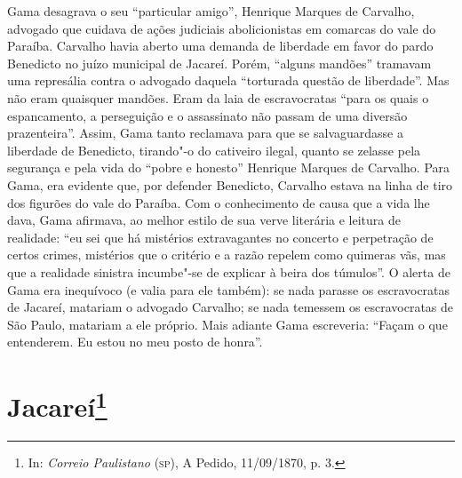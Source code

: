 \@openrighttrue\makeatother \endgroup

\pagebreak
\mbox{}\vfill
\thispagestyle{empty}

{\small\noindent
Gama desagrava o seu ``particular amigo'', Henrique Marques de
Carvalho, advogado que cuidava de ações judiciais abolicionistas em
comarcas do vale do Paraíba. Carvalho havia aberto uma demanda de
liberdade em favor do pardo Benedicto no juízo municipal de Jacareí.
Porém, ``alguns mandões'' tramavam uma represália contra o advogado
daquela ``torturada questão de liberdade''. Mas não eram quaisquer
mandões. Eram da laia de escravocratas ``para os quais o espancamento, a
perseguição e o assassinato não passam de uma diversão prazenteira''.
Assim, Gama tanto reclamava para que se salvaguardasse a liberdade de
Benedicto, tirando"-o do cativeiro ilegal, quanto se zelasse pela
segurança e pela vida do ``pobre e honesto'' Henrique Marques de Carvalho.
Para Gama, era evidente que, por defender Benedicto, Carvalho estava na
linha de tiro dos figurões do vale do Paraíba. Com o conhecimento de
causa que a vida lhe dava, Gama afirmava, ao melhor estilo de sua verve
literária e leitura de realidade: ``eu sei que há mistérios extravagantes
no concerto e perpetração de certos crimes, mistérios que o critério e a
razão repelem como quimeras vãs, mas que a realidade sinistra incumbe"-se
de explicar à beira dos túmulos''. O alerta de Gama era inequívoco (e
valia para ele também): se nada parasse os escravocratas de Jacareí,
matariam o advogado Carvalho; se nada temessem os escravocratas de São
Paulo, matariam a ele próprio. Mais adiante Gama escreveria: ``Façam o
que entenderem. Eu estou no meu posto de honra''.}

\chapter{Jacareí\footnote[*]{In: \emph{Correio Paulistano} (\textsc{sp}), A
  Pedido, 11/09/1870, p. 3.}}


